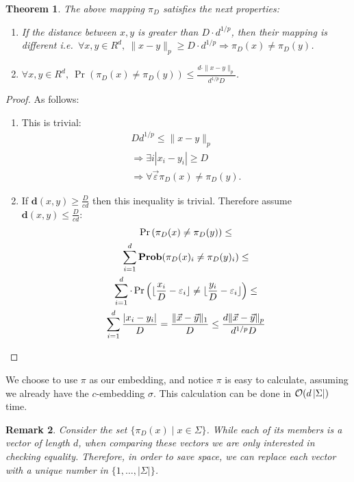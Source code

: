 \documentclass[11pt]{article}
\newcommand{\calO}{{\cal{O}}}
\newtheorem{thm}{Theorem}[section]
\newtheorem{rem}[thm]{Remark}
\newcommand{\envert}[1]{\left\lvert#1\right\rvert}
\let\abs=\envert
\newcommand{\dist}{\textbf{d}}
\begin{document}
\begin{thm}\label{emmbed}
The above mapping $\pi_D$ satisfies the next properties:
\begin{enumerate}
\item If the distance between $x,y$ is greater than ${D}\cdot d^{1/p}$, then their mapping
  is different i.e.\
  $\forall x,y \in R^d, \ \|x-y\|_p\geq D \cdot d^{1/p} \Rightarrow
  \pi_D(x)\neq \pi_D(y)$.
\item  $\forall x,y\in R^d,\ \Pr(\pi_D(x)\neq \pi_D(y)) \leq
  \frac{d\cdot\|x-y\|_p}{d^{1/p}D}$.
\end{enumerate}
\end{thm}
\begin{proof} As follows:
\begin{enumerate}
\item This is  trivial:
\begin{gather*}
Dd^{1/p}\leq \|x-y\|_{p} \\
\Rightarrow\exists i \abs{x_i-y_i}\geq D   \\
\Rightarrow\forall  \stackrel{\rightarrow}{\varepsilon} \pi_D(x)
\neq \pi_D(y).
\end{gather*}
\item If $\dist(x,y)\geq \frac{D}{cd} $ then this inequality is trivial.
Therefore assume  $\dist(x,y)\leq \frac{D}{cd}$:
\begin{gather*}
\Pr\left(\pi_D(x)\neq \pi_D(y)\right)\leq\\
  \sum_{i=1}^d{\bf{Prob}}(\pi_D(x)_i\neq \pi_D(y)_i)\leq\\
\sum_{i=1}^d\cdot\Pr\left(\lfloor \frac{x_i}{D}-
\varepsilon_i\rfloor\neq \lfloor \frac{y_i}{D}-
  \varepsilon_i\rfloor\right)\leq \\
  \sum_{i=1}^d\frac{\abs{x_i-y_i}}{D}=\frac{\|\vec{x}-\vec{y}\|_1}{D}\leq \frac{d\|\vec{x}-\vec{y}\|_p}{d^{1/p}D}
\end{gather*}
\end{enumerate}
\end{proof}
We choose to use $\pi$ as our embedding, and notice $\pi$ is easy
to calculate, assuming we already have the $c$-embedding $\sigma$.
This calculation can be done in $\calO(d\abs{\Sigma})$ time.
\begin{rem}
Consider the set $\{ \pi_{D}(x) \mid x \in \Sigma  \}$. While each
of its members is a vector of length $d$, when comparing these
vectors we are only interested in checking equality. Therefore, in
order to save space, we can replace each vector with a unique
number in $\{1 , \ldots, \abs{\Sigma} \}$.
\end{rem}
\end{document}
